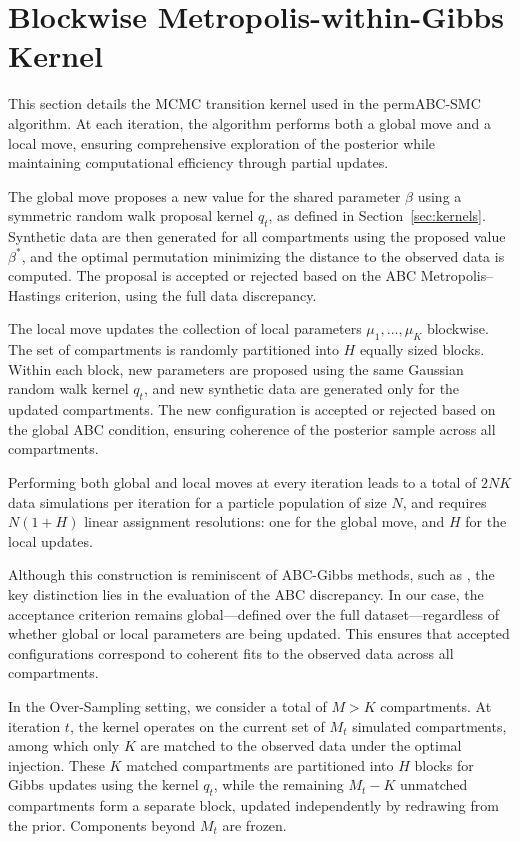 \documentclass[lineno]{biometrika}
\def\globparam{\beta}
\def\locparam{\mu}
\begin{document}
\section{Blockwise Metropolis-within-Gibbs Kernel}
\label{appendix_kernel}

This section details the MCMC transition kernel used in the permABC-SMC algorithm. At each iteration, the algorithm performs both a global move and a local move, ensuring comprehensive exploration of the posterior while maintaining computational efficiency through partial updates.

The global move proposes a new value for the shared parameter \( \globparam \) using a symmetric random walk proposal kernel \( q_t \), as defined in Section~\ref{sec:kernels}. Synthetic data are then generated for all compartments using the proposed value \( \globparam^* \), and the optimal permutation minimizing the distance to the observed data is computed. The proposal is accepted or rejected based on the ABC Metropolis–Hastings criterion, using the full data discrepancy.

The local move updates the collection of local parameters \( \locparam_1, \dots, \locparam_K \) blockwise. The set of compartments is randomly partitioned into \( H \) equally sized blocks. Within each block, new parameters are proposed using the same Gaussian random walk kernel \( q_t \), and new synthetic data are generated only for the updated compartments. The new configuration is accepted or rejected based on the global ABC condition, ensuring coherence of the posterior sample across all compartments.

Performing both global and local moves at every iteration leads to a total of \( 2NK \) data simulations per iteration for a particle population of size \( N \), and requires \( N(1 + H) \) linear assignment resolutions: one for the global move, and \( H \) for the local updates.

Although this construction is reminiscent of ABC-Gibbs methods, such as \citet{clarte2021componentwise}, the key distinction lies in the evaluation of the ABC discrepancy. In our case, the acceptance criterion remains global—defined over the full dataset—regardless of whether global or local parameters are being updated. This ensures that accepted configurations correspond to coherent fits to the observed data across all compartments.

In the Over-Sampling setting, we consider a total of \( M > K \) compartments. At iteration \( t \), the kernel operates on the current set of \( M_t \) simulated compartments, among which only \( K \) are matched to the observed data under the optimal injection. These \( K \) matched compartments are partitioned into \( H \) blocks for Gibbs updates using the kernel \( q_t \), while the remaining \( M_t - K \) unmatched compartments form a separate block, updated independently by redrawing from the prior. Components beyond \( M_t \) are frozen.
\end{document}
